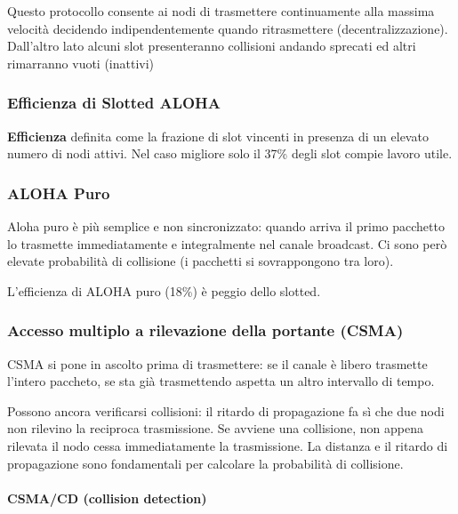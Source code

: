 \documentclass{report}
\begin{document}
Questo protocollo consente ai nodi di trasmettere continuamente alla
massima velocità decidendo indipendentemente quando ritrasmettere
(decentralizzazione). Dall'altro lato alcuni slot presenteranno
collisioni andando sprecati ed altri rimarranno vuoti (inattivi)

\hypertarget{header-n71}{%
\subsubsection{Efficienza di Slotted ALOHA}\label{header-n71}}

\textbf{Efficienza} definita come la frazione di slot vincenti in
presenza di un elevato numero di nodi attivi. Nel caso migliore solo il
37\% degli slot compie lavoro utile.

\hypertarget{header-n73}{%
\subsubsection{ALOHA Puro}\label{header-n73}}

Aloha puro è più semplice e non sincronizzato: quando arriva il primo
pacchetto lo trasmette immediatamente e integralmente nel canale
broadcast. Ci sono però elevate probabilità di collisione (i pacchetti
si sovrappongono tra loro).

L'efficienza di ALOHA puro (18\%) è peggio dello slotted.

\hypertarget{header-n76}{%
\subsubsection{Accesso multiplo a rilevazione della portante
(CSMA)}\label{header-n76}}

CSMA si pone in ascolto prima di trasmettere: se il canale è libero
trasmette l'intero paccheto, se sta già trasmettendo aspetta un altro
intervallo di tempo.

Possono ancora verificarsi collisioni: il ritardo di propagazione fa sì
che due nodi non rilevino la reciproca trasmissione. Se avviene una
collisione, non appena rilevata il nodo cessa immediatamente la
trasmissione. La distanza e il ritardo di propagazione sono fondamentali
per calcolare la probabilità di collisione.

\hypertarget{header-n79}{%
\paragraph{CSMA/CD (collision detection)}\label{header-n79}}
\end{document}
